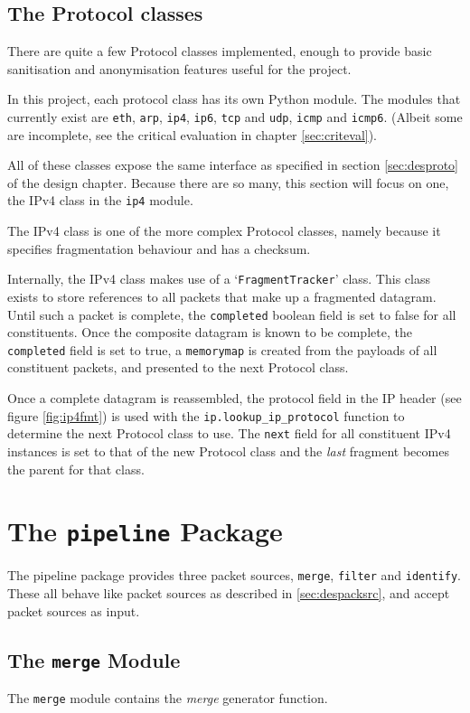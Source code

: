 \documentclass[10pt,a4paper,notitlepage]{report}
\begin{document}
\subsection{The Protocol classes}
There are quite a few Protocol classes implemented, enough to provide basic sanitisation and anonymisation features useful for the project.

In this project, each protocol class has its own Python module. The modules that currently exist are \texttt{eth}, \texttt{arp}, \texttt{ip4}, \texttt{ip6}, \texttt{tcp} and \texttt{udp}, \texttt{icmp} and \texttt{icmp6}. (Albeit some are incomplete, see the critical evaluation in chapter \ref{sec:criteval}).

All of these classes expose the same interface as specified in section \ref{sec:desproto} of the design chapter. Because there are so many, this section will focus on one, the IPv4 class in the \texttt{ip4} module.

The IPv4 class is one of the more complex Protocol classes, namely because it specifies fragmentation behaviour and has a checksum.

Internally, the IPv4 class makes use of a `\texttt{FragmentTracker}' class. This class exists to store references to all packets that make up a fragmented datagram. Until such a packet is complete, the \texttt{completed} boolean field is set to false for all constituents. Once the composite datagram is known to be complete, the \texttt{completed} field is set to true, a \texttt{memorymap} is created from the payloads of all constituent packets, and presented to the next Protocol class.

Once a complete datagram is reassembled, the protocol field in the IP header (see figure \ref{fig:ip4fmt}) is used with the \texttt{ip.lookup_ip_protocol} function to determine the next Protocol class to use. The \texttt{next} field for all constituent IPv4 instances is set to that of the new Protocol class and the \emph{last} fragment becomes the parent for that class.

\section{The \texttt{pipeline} Package}
The pipeline package provides three packet sources, \texttt{merge}, \texttt{filter} and \texttt{identify}.
These all behave like packet sources as described in \ref{sec:despacksrc}, and accept packet sources as input.

\subsection{The \texttt{merge} Module}
The \texttt{merge} module contains the \emph{merge} generator function.
\end{document}
